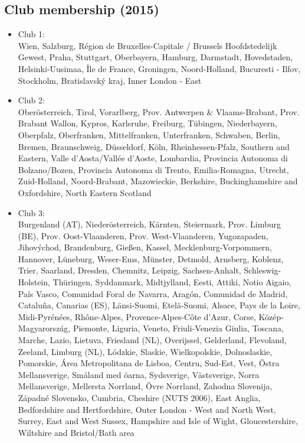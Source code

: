 \documentclass[11pt]{article}
\begin{document}
\subsection{Club membership (2015)}
\begin{itemize}
\item Club 1:\\
Wien, Salzburg, Région de Bruxelles-Capitale / Brussels Hoofdstedelijk Gewest, Praha, Stuttgart, Oberbayern, Hamburg, Darmstadt, Hovedstaden, Helsinki-Uusimaa, Île de France, Groningen, Noord-Holland, Bucuresti - Ilfov, Stockholm, Bratislavský kraj, Inner London - East 
\item Club 2:\\
Oberösterreich, Tirol, Vorarlberg, Prov. Antwerpen \& Vlaams-Brabant, Prov. Brabant Wallon, Kypros, Karlsruhe, Freiburg, Tübingen, Niederbayern, Oberpfalz, Oberfranken, Mittelfranken, Unterfranken, 
Schwaben, Berlin, Bremen, Braunschweig, Düsseldorf, Köln, Rheinhessen-Pfalz, Southern and Eastern, Valle d'Aosta/Vallée d'Aoste, Lombardia, Provincia Autonoma di Bolzano/Bozen, Provincia Autonoma di Trento, Emilia-Romagna, Utrecht, Zuid-Holland, Noord-Brabant, Mazowieckie, Berkshire, Buckinghamshire and Oxfordshire, North Eastern Scotland 
\item Club 3: \\
Burgenland (AT), Niederösterreich, Kärnten, Steiermark,
Prov. Limburg (BE), Prov. Oost-Vlaanderen, Prov. West-Vlaanderen, Yugozapaden, Jihovýchod, Brandenburg, Gießen, Kassel, Mecklenburg-Vorpommern, Hannover, Lüneburg, Weser-Ems, Münster, Detmold, Arnsberg, Koblenz, Trier, Saarland, Dresden, Chemnitz, Leipzig,        Sachsen-Anhalt, Schleswig-Holstein, Thüringen, Syddanmark, Midtjylland, Eesti, Attiki, Notio Aigaio, País Vasco, Comunidad Foral de Navarra, Aragón, Comunidad de Madrid, Cataluña, Canarias (ES), Länsi-Suomi, Etelä-Suomi, Alsace, Pays de la Loire, Midi-Pyrénées, Rhône-Alpes,      Provence-Alpes-Côte d'Azur, Corse, Közép-Magyarország, Piemonte, Liguria, Veneto, Friuli-Venezia Giulia, Toscana, Marche, Lazio, Lietuva, Friesland (NL), Overijssel, Gelderland, Flevoland, Zeeland, Limburg (NL), Lódzkie, Slaskie, Wielkopolskie, Dolnoslaskie, Pomorskie, Área Metropolitana de Lisboa, Centru, Sud-Est, Vest, Östra Mellansverige, Småland med öarna, Sydsverige, Västsverige, Norra Mellansverige, Mellersta Norrland, Övre Norrland, Zahodna Slovenija, Západné Slovensko, Cumbria, Cheshire (NUTS 2006), East Anglia, Bedfordshire and Hertfordshire, Outer London - West and North West, Surrey, East and West Sussex, Hampshire and Isle of Wight, Gloucestershire, Wiltshire and Bristol/Bath area 

\end{itemize}
\end{document}
